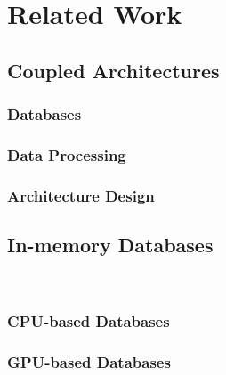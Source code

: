 \section{Related Work} \label{sec:related}

\subsection{Coupled Architectures}

\subsubsection{Databases}

\subsubsection{Data Processing}

\subsubsection{Architecture Design}

\subsection{In-memory Databases}\

\subsubsection{CPU-based Databases}

\subsubsection{GPU-based Databases}